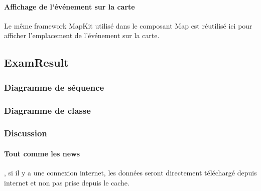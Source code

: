 				\paragraph{Affichage de l'événement sur la carte}  Le même framework MapKit utilisé dans le composant Map est réutilisé ici pour afficher l'emplacement de l'événement sur la carte.

	\subsection{ExamResult}
					\subsubsection*{Diagramme de séquence}

					\subsubsection*{Diagramme de classe}
						 	
					\subsubsection*{Discussion}
					\paragraph{Tout comme les news}, si il y a une connexion internet, les données seront directement téléchargé depuis internet et non pas prise depuis le cache.

